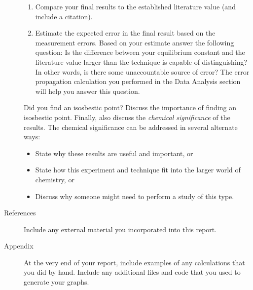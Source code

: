 \begin{description}
\begin{enumerate}
		\item Compare your final results to the established literature value (and include a citation). 
		\item Estimate the expected error in the final result based on the measurement errors. Based on your estimate answer the following question: Is the difference between your equilibrium constant and the literature value larger than the technique is capable of distinguishing? In other words, is there some unaccountable source of error? The error propagation calculation you performed in the Data Analysis section will help you answer this question. 
	\end{enumerate}
	Did you find an isosbestic point? Discuss the importance of finding an isosbestic point. 
	Finally, also discuss the \emph{chemical significance} of the results. 
	The chemical significance can be addressed in several alternate ways:
	\begin{itemize}
		\item State why these results are useful and important, or
		\item State how this experiment and technique fit into the larger world of chemistry, or
		\item Discuss why someone might need to perform a study of this type.
	\end{itemize}
	\item[References] Include any external material you incorporated into this report. 
	\item[Appendix] At the very end of your report, include examples of any calculations that you did by hand. 
	Include any additional files and code that you used to generate your graphs.
\end{description}
